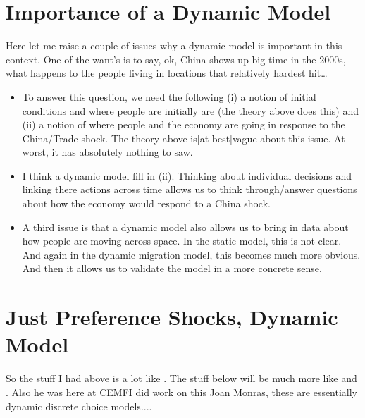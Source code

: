\documentclass[pdftex,12pt]{article}
\begin{document}
\section{Importance of a Dynamic Model}

Here let me raise a couple of issues why a dynamic model is important in this context. One of the want's is to say, ok, China shows up big time in the 2000s, what happens to the people living in locations that relatively hardest hit\ldots
\begin{itemize}
\item To answer this question, we need the following (i) a notion of initial conditions and where people are initially are (the theory above does this) and (ii) a notion of where  people and the economy are going in response to the China/Trade shock. The theory above is|at best|vague about this issue. At worst, it has absolutely nothing to saw.
    
\item I think a dynamic model fill in (ii). Thinking about individual decisions and linking there actions across time allows us to think through/answer questions about how the economy would respond to a China shock.

\item A third issue is that a dynamic model also allows us to bring in data about how people are moving across space. In the static model, this is not clear. And again in the dynamic migration model, this becomes much more obvious. And then it allows us to validate the model in a more concrete sense.
\end{itemize}

\section{Just Preference Shocks, Dynamic Model}

So the stuff I had above is a lot like \citet{galle2015slicing}. The stuff below will be much more like \citet{caliendo2015trade} and \citet{artucc2010trade}. Also he was here at CEMFI did work on this Joan Monras, these are essentially dynamic discrete choice models....
\end{document}
